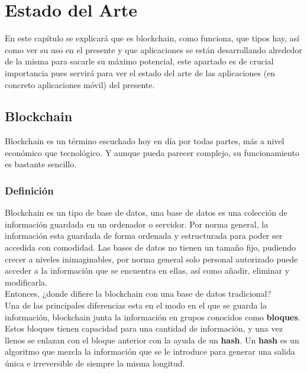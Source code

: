 \chapter{Estado del Arte}
\label{cap:EstadoArte}

\setlength{\parindent}{0pt}

En este capítulo se explicará que es blockchain, como funciona, que tipos hay, así como ver su uso en el presente y que aplicaciones se están desarrollando alrededor de la misma para sacarle su máximo potencial, este apartado es de crucial importancia pues servirá para ver el estado del arte de las aplicaciones (en concreto aplicaciones móvil) del presente.

\section{Blockchain}
Blockchain\cite{b1,b2,b3} es un término escuchado hoy en día por todas partes, más a nivel económico que tecnológico. Y aunque pueda parecer complejo, su funcionamiento es bastante sencillo.

\subsection{Definición}
Blockchain es un tipo de base de datos, una base de datos es una colección de información guardada en un ordenador o servidor. Por norma general, la información esta guardada de forma ordenada y estructurada para poder ser accedida con comodidad. Las bases de datos no tienen un tamaño fijo, pudiendo crecer a niveles inimaginables, por norma general solo personal autorizado puede acceder a la información que se encuentra en ellas, así como añadir, eliminar y modificarla. \\

Entonces, ¿donde difiere la blockchain con una base de datos tradicional? \\

Una de las principales diferencias esta en el modo en el que se guarda la información, blockchain junta la información en grupos conocidos como \textbf{bloques}. Estos bloques tienen capacidad para una cantidad de información, y una vez llenos se enlazan con el bloque anterior con la ayuda de un \textbf{hash}. Un \textbf{hash}\cite{whatIsHash} es un algoritmo que mezcla la información que se le introduce para generar una salida única e irreversible de siempre la misma longitud. \\

